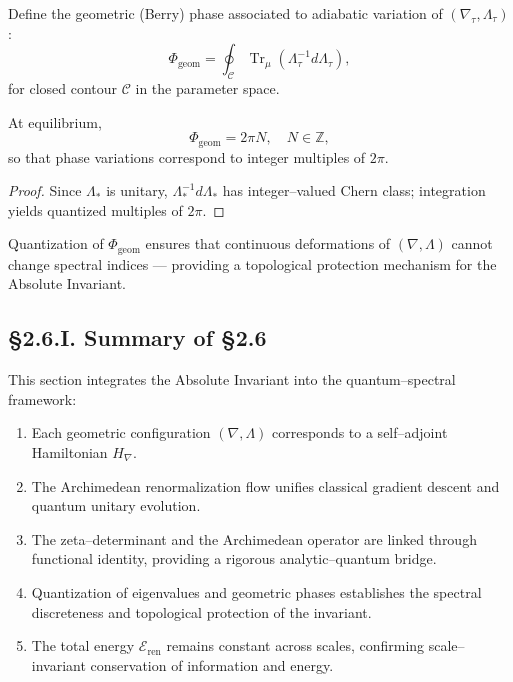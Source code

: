 \begin{definition}
Define the geometric (Berry) phase associated to adiabatic variation of $(\nabla_\tau,\Lambda_\tau)$:
\[
\Phi_\mathrm{geom} = \oint_{\mathcal{C}} \operatorname{Tr}_\mu(\Lambda_\tau^{-1} d\Lambda_\tau),
\]
for closed contour $\mathcal{C}$ in the parameter space.
\]
\end{definition}

\begin{theorem}\label{thm:2.6.phase}
At equilibrium,
\[
\Phi_\mathrm{geom}=2\pi N,\quad N\in\mathbb{Z},
\]
so that phase variations correspond to integer multiples of $2\pi$.
\end{theorem}

\begin{proof}
Since $\Lambda_\ast$ is unitary, $\Lambda_\ast^{-1}d\Lambda_\ast$ has integer–valued Chern class; integration yields quantized multiples of $2\pi$.
\end{proof}

\begin{corollary}
Quantization of $\Phi_\mathrm{geom}$ ensures that continuous deformations of $(\nabla,\Lambda)$ cannot change spectral indices — providing a topological protection mechanism for the Absolute Invariant.
\end{corollary}

\subsection*{§2.6.I. Summary of §2.6}

This section integrates the Absolute Invariant into the quantum–spectral framework:

\begin{enumerate}
  \item Each geometric configuration $(\nabla,\Lambda)$ corresponds to a self–adjoint Hamiltonian $H_\nabla$.
  \item The Archimedean renormalization flow unifies classical gradient descent and quantum unitary evolution.
  \item The zeta–determinant and the Archimedean operator are linked through functional identity, providing a rigorous analytic–quantum bridge.
  \item Quantization of eigenvalues and geometric phases establishes the spectral discreteness and topological protection of the invariant.
  \item The total energy $\mathcal{E}_{\mathrm{ren}}$ remains constant across scales, confirming scale–invariant conservation of information and energy.
\end{enumerate}

